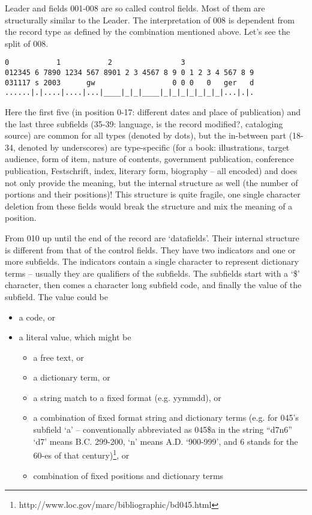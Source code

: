 Leader and fields 001-008 are so called control fields. Most of them are structurally similar to the Leader. The interpretation of 008 is dependent from the record type as defined by the combination mentioned above. Let's see the split of 008.

\begin{small}
\begin{Verbatim}[samepage=true]
0           1           2                3  
012345 6 7890 1234 567 8901 2 3 4567 8 9 0 1 2 3 4 567 8 9
031117 s 2003      gw                  0 0 0   0   ger   d
......|.|....|....|...|____|_|_|____|_|_|_|_|_|_|_|...|.|.
\end{Verbatim}
\end{small}

Here the first five (in position 0-17: different dates and place of publication) and the last three subfields (35-39: language, is the record modified?, cataloging source) are common for all types (denoted by dots), but the in-between part (18-34, denoted by underscores) are type-specific (for a book: illustrations, target audience, form of item, nature of contents, government publication, conference publication, Festschrift, index, literary form, biography -- all encoded) and does not only provide the meaning, but the internal structure as well (the number of portions and their positions)! This structure is quite fragile, one single character deletion from these fields would break the structure and mix the meaning of a position.

From 010 up until the end of the record are `datafields'. Their internal structure is different from that of the control fields. They have two indicators and one or more subfields. The indicators contain a single character to represent dictionary terms -- usually they are qualifiers of the subfields. The subfields start with a `\$' character, then comes a character long subfield code, and finally the value of the subfield. The value could be

\begin{itemize}
 \setlength{\parskip}{0pt}
 \setlength{\itemsep}{0pt plus 1pt}
 \item a code, or
 \item a literal value, which might be
 \begin{itemize}
  \setlength{\parskip}{0pt}
  \setlength{\itemsep}{0pt plus 1pt}
  \item a free text, or
  \item a dictionary term, or
  \item a string match to a fixed format (e.g. yymmdd), or
  \item a combination of fixed format string and dictionary terms (e.g. for 045's subfield `a' -- conventionally abbreviated as 045\$a in the string ``d7n6'' `d7' means B.C. 299-200, `n' means A.D. `900-999', and 6 stands for the 60-es of that century)\footnote{http://www.loc.gov/marc/bibliographic/bd045.html}, or
  \item combination of fixed positions and dictionary terms
 \end{itemize}
\end{itemize}

